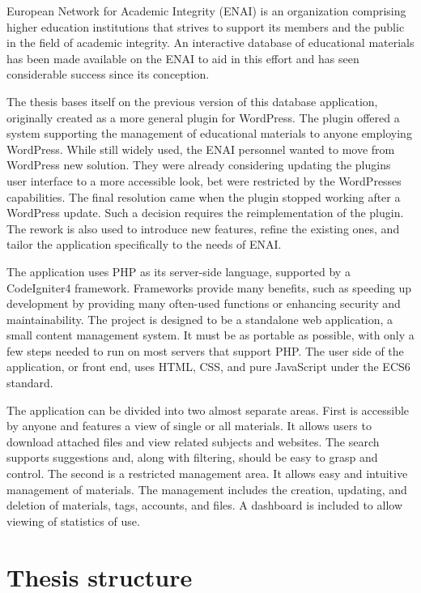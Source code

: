 \documentclass[
  digital,     %
  oneside,     %
  nosansbold,  %
  colorbold, %
  lof,         %
  lot,         %
]{fithesis4}
\begin{document}
European Network for Academic Integrity (ENAI) is an organization comprising
higher education institutions that strives to support its members and the public
in the field of academic integrity. An interactive database of educational
materials has been made available on the ENAI to aid in this effort and has seen
considerable success since its conception.

The thesis bases itself on the previous version of this database application,
originally created as a more general plugin for WordPress. The plugin offered
a system supporting the management of educational materials to anyone employing
WordPress. While still widely used, the ENAI personnel wanted to move from
WordPress new solution. They were already considering updating the plugins user
interface to a more accessible look, bet were restricted by the WordPresses capabilities.
The final resolution came when the plugin stopped working after a WordPress update.
Such a decision requires the reimplementation of the plugin. The rework is also used
to introduce new features, refine the existing ones, and tailor the application specifically
to the needs of ENAI.

The application uses PHP as its \mbox{server-side} language, supported by a CodeIgniter4
framework. Frameworks provide many benefits, such as speeding up development by
providing many \mbox{often-used} functions or enhancing security and maintainability.
The project is designed to be a standalone web application, a small content
management system. It must be as portable as possible, with only a few steps
needed to run on most servers that support PHP. The user side of the application,
or front end, uses HTML, CSS, and pure JavaScript under the ECS6 standard.

The application can be divided into two almost separate areas. First is accessible by anyone
and features a view of single or all materials. It allows users to download attached files and
view related subjects and websites. The search supports suggestions and, along with filtering,
should be easy to grasp and control. The second is a restricted management area. It allows easy
and intuitive management of materials. The management includes the creation, updating, and
deletion of materials, tags, accounts, and files. A dashboard is included to allow viewing of
statistics of use.

\section{Thesis structure}
\end{document}
